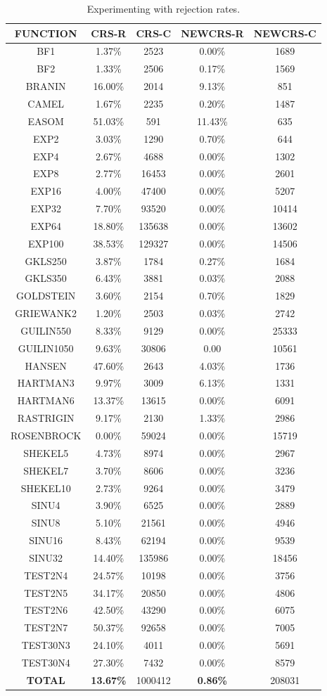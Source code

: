 \documentclass[symmetry,article,submit,moreauthors,pdftex]{Definitions/mdpi}
\begin{document}
\begin{table}
\caption{Experimenting with rejection rates.\label{tab:Experimenting-with-rejection}}

\begin{centering}
\begin{tabular}{|c|c|c|c|c|}
\hline 
FUNCTION & CRS-R & CRS-C & NEWCRS-R & NEWCRS-C\tabularnewline
\hline 
\hline 
BF1 & 1.37\% & 2523 & 0.00\% & 1689\tabularnewline
\hline 
BF2 & 1.33\% & 2506 & 0.17\% & 1569\tabularnewline
\hline 
BRANIN & 16.00\% & 2014 & 9.13\% & 851\tabularnewline
\hline 
CAMEL & 1.67\% & 2235 & 0.20\% & 1487\tabularnewline
\hline 
EASOM & 51.03\% & 591 & 11.43\% & 635\tabularnewline
\hline 
EXP2 & 3.03\% & 1290 & 0.70\% & 644\tabularnewline
\hline 
EXP4 & 2.67\% & 4688 & 0.00\% & 1302\tabularnewline
\hline 
EXP8 & 2.77\% & 16453 & 0.00\% & 2601\tabularnewline
\hline 
EXP16 & 4.00\% & 47400 & 0.00\% & 5207\tabularnewline
\hline 
EXP32 & 7.70\% & 93520 & 0.00\% & 10414\tabularnewline
\hline 
EXP64 & 18.80\% & 135638 & 0.00\% & 13602\tabularnewline
\hline 
EXP100 & 38.53\% & 129327 & 0.00\% & 14506\tabularnewline
\hline 
GKLS250 & 3.87\% & 1784 & 0.27\% & 1684\tabularnewline
\hline 
GKLS350 & 6.43\% & 3881 & 0.03\% & 2088\tabularnewline
\hline 
GOLDSTEIN & 3.60\% & 2154 & 0.70\% & 1829\tabularnewline
\hline 
GRIEWANK2 & 1.20\% & 2503 & 0.03\% & 2742\tabularnewline
\hline 
GUILIN550 & 8.33\% & 9129 & 0.00\% & 25333\tabularnewline
\hline 
GUILIN1050 & 9.63\% & 30806 & 0.00 & 10561\tabularnewline
\hline 
HANSEN & 47.60\% & 2643 & 4.03\% & 1736\tabularnewline
\hline 
HARTMAN3 & 9.97\% & 3009 & 6.13\% & 1331\tabularnewline
\hline 
HARTMAN6 & 13.37\% & 13615 & 0.00\% & 6091\tabularnewline
\hline 
RASTRIGIN & 9.17\% & 2130 & 1.33\% & 2986\tabularnewline
\hline 
ROSENBROCK & 0.00\% & 59024 & 0.00\% & 15719\tabularnewline
\hline 
SHEKEL5 & 4.73\% & 8974 & 0.00\% & 2967\tabularnewline
\hline 
SHEKEL7 & 3.70\% & 8606 & 0.00\% & 3236\tabularnewline
\hline 
SHEKEL10 & 2.73\% & 9264 & 0.00\% & 3479\tabularnewline
\hline 
SINU4 & 3.90\% & 6525 & 0.00\% & 2889\tabularnewline
\hline 
SINU8 & 5.10\% & 21561 & 0.00\% & 4946\tabularnewline
\hline 
SINU16 & 8.43\% & 62194 & 0.00\% & 9539\tabularnewline
\hline 
SINU32 & 14.40\% & 135986 & 0.00\% & 18456\tabularnewline
\hline 
TEST2N4 & 24.57\% & 10198 & 0.00\% & 3756\tabularnewline
\hline 
TEST2N5 & 34.17\% & 20850 & 0.00\% & 4806\tabularnewline
\hline 
TEST2N6 & 42.50\% & 43290 & 0.00\% & 6075\tabularnewline
\hline 
TEST2N7 & 50.37\% & 92658 & 0.00\% & 7005\tabularnewline
\hline 
TEST30N3 & 24.10\% & 4011 & 0.00\% & 5691\tabularnewline
\hline 
TEST30N4 & 27.30\% & 7432 & 0.00\% & 8579\tabularnewline
\hline 
\textbf{TOTAL} & \textbf{13.67\%} & 1000412 & \textbf{0.86\%} & 208031\tabularnewline
\hline 
\end{tabular}
\par\end{centering}
\end{table}
\end{document}
